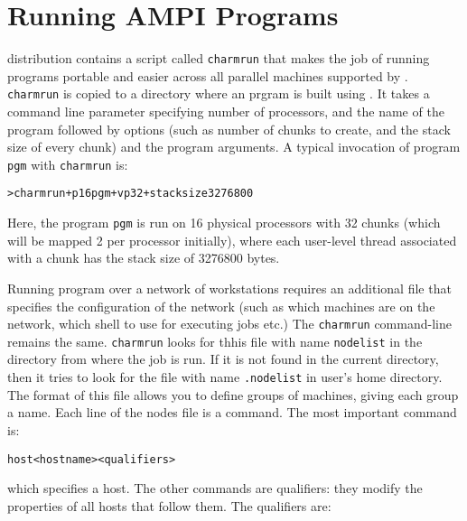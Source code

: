 \documentclass[10pt]{article}
\begin{document}
\section{Running AMPI Programs}

\charmpp{} distribution contains a script called \texttt{charmrun} that makes
the job of running \ampi{} programs portable and easier across all parallel
machines supported by \charmpp{}. \texttt{charmrun} is copied to a directory
where an \ampi{} prgram is built using \charmc{}. It takes a command line
parameter specifying number of processors, and the name of the program followed
by \ampi{} options (such as number of chunks to create, and the stack size of
every chunk) and the program arguments. A typical invocation of \ampi{} program
\texttt{pgm} with \texttt{charmrun} is:

\begin{alltt}
> charmrun +p 16 pgm +vp 32 +stacksize 3276800
\end{alltt}

Here, the \ampi{} program \texttt{pgm} is run on 16 physical processors with
32 chunks (which will be mapped 2 per processor initially), where each
user-level thread associated with a chunk has the stack size of 3276800 bytes.

Running \ampi{} program over a network of workstations requires an additional
file that specifies the configuration of the network (such as which machines
are on the network, which shell to use for executing jobs etc.) The
\texttt{charmrun} command-line remains the same.  \texttt{charmrun} looks for
thhis file with name \texttt{nodelist} in the directory from where the job is
run. If it is not found in the current directory, then it tries to look for the
file with name \texttt{.nodelist} in user's home directory. The format of this
file allows you to define groups of machines, giving each group a name.  Each
line of the nodes file is a command.  The most important command is:

\begin{alltt}
host <hostname> <qualifiers>
\end{alltt}

which specifies a host.  The other commands are qualifiers: they modify
the properties of all hosts that follow them.  The qualifiers are:
\end{document}
